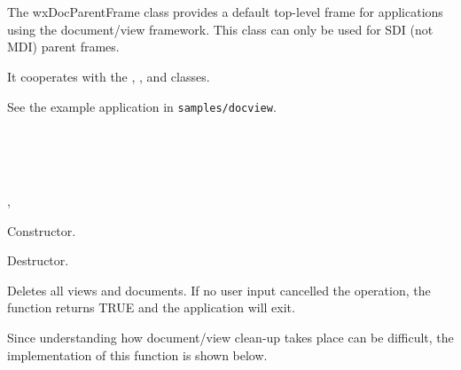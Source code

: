 \section{}\label{wxdocparentframe}

The wxDocParentFrame class provides a default top-level frame for
applications using the document/view framework. This class can only be used for SDI (not MDI) parent frames.

It cooperates with the , ,
\rtfsp{} and  classes.

See the example application in {\tt samples/docview}.


\\
\\
\\


, 




Constructor.



Destructor.



Deletes all views and documents. If no user input cancelled the
operation, the function returns TRUE and the application will exit.

Since understanding how document/view clean-up takes place can be difficult,
the implementation of this function is shown below.

